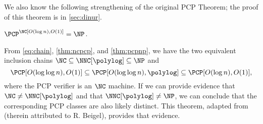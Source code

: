 We also know the following strengthening of the original PCP Theorem; the proof of this theorem is in \autoref{sec:dinur}.
\begin{theorem}\label{thm:pcpnp}
  $\PCP^\NC[O(\log n), O(1)] = \NP$.
\end{theorem}

From \autoref{eq:chain}, \autoref{thm:ncpcp}, and \autoref{thm:pcpnp}, we have the two equivalent inclusion chains
$
  \NC \subseteq \NNC[\polylog] \subseteq \NP
$
and
\begin{equation*}
  \PCP[O(\loglog n), O(1)] \subseteq \PCP[O(\loglog n), \polylog] \subseteq \PCP[O(\log n), O(1)],
\end{equation*}
where the PCP verifier is an $\NC$ machine.
If we can provide evidence that $\NC \neq \NNC[\polylog]$ and that $\NNC[\polylog] \neq \NP$, we can conclude that the corresponding PCP classes are also likely distinct.
This theorem, adapted from \autocite[Theorem~1]{dt90} (therein attributed to R. Beigel), provides that evidence.


